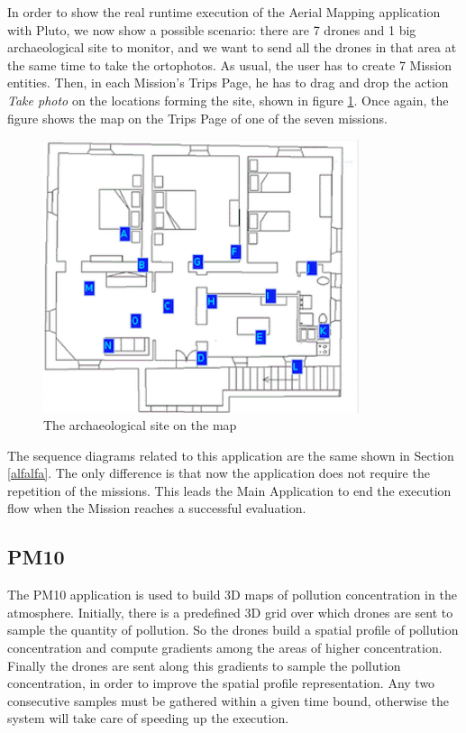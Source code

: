 In order to show the real runtime execution of the Aerial Mapping application with Pluto, we now show a possible scenario:
there are 7 drones and 1 big archaeological site to monitor, and we want to send all the drones in that area at the same time to take the ortophotos.
As usual, the user has to create 7 Mission entities.
Then, in each Mission's Trips Page, he has to drag and drop the action \textit{Take photo} on the locations forming the site, shown in figure \ref{fig:puttiArea}.
Once again, the figure shows the map on the Trips Page of one of the seven missions.

\begin{figure}[H]
\centering
\includegraphics[width=\linewidth, height=8cm]{pictures/puttiArea.png}
\caption{The archaeological site on the map}
\label{fig:puttiArea}
\end{figure}

The sequence diagrams related to this application are the same shown in Section \ref{alfalfa}. 
The only difference is that now the application does not require the repetition of the missions.
This leads the Main Application to end the execution flow when the Mission reaches a successful evaluation.

\subsection{PM10}

The PM10\cite{pm10} application is used to build 3D maps of pollution concentration in the atmosphere. 
Initially, there is a predefined 3D grid over which drones are sent to sample the quantity of pollution.
So the drones build a spatial profile of pollution concentration and compute gradients among the areas of higher concentration.
Finally the drones are sent along this gradients to sample the pollution concentration, in order to improve the spatial profile representation.
Any two consecutive samples must be gathered within a given time bound, otherwise the system will take care of speeding up the execution.

